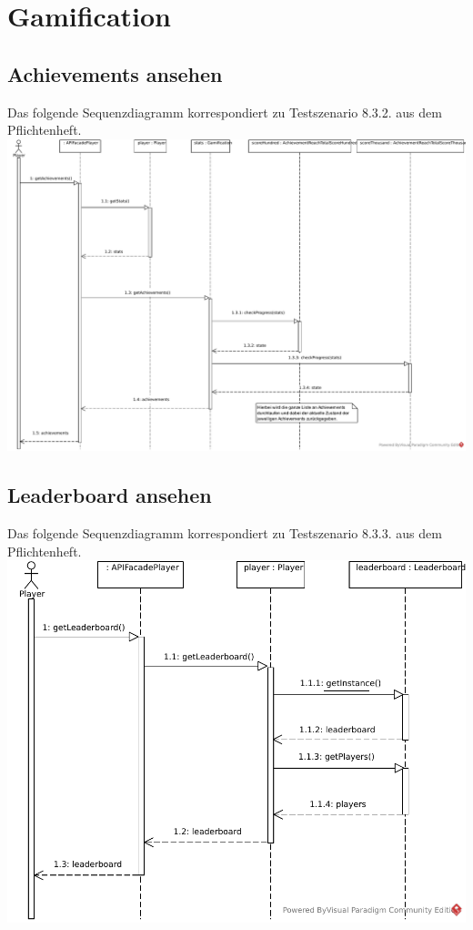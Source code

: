 \documentclass[a4paper]{scrreprt}
\begin{document}
	\section{Gamification}
	\subsection{Achievements ansehen}
	Das folgende Sequenzdiagramm korrespondiert zu Testszenario 8.3.2. aus dem Pflichtenheft. \\
	\includegraphics[width=\textwidth]{img/AchievementsAnsehen.pdf}


	\subsection{Leaderboard ansehen}
	Das folgende Sequenzdiagramm korrespondiert zu Testszenario 8.3.3. aus dem Pflichtenheft. \\
	\includegraphics[width=\textwidth]{img/LeaderboardAnsehen.pdf}
\end{document}
